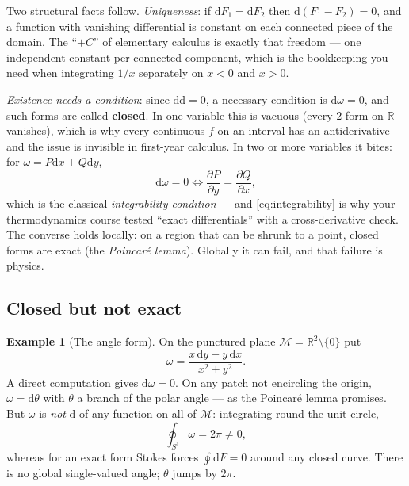 \documentclass[10pt,a4paper]{article}
\newcommand{\dd}{\mathrm{d}}
\newcommand{\R}{\mathbb{R}}
\newcommand{\M}{\mathcal{M}}
\newcommand{\pd}[2]{\frac{\partial #1}{\partial #2}}
\theoremstyle{plain}
\theoremstyle{definition}
\newtheorem{ex}[thm]{Example}
\numberwithin{equation}{section}
\begin{document}
\noindent Two structural facts follow. \emph{Uniqueness}: if $\dd F_1=\dd F_2$ then
$\dd(F_1-F_2)=0$, and a function with vanishing differential is constant on each connected
piece of the domain. The ``$+C$'' of elementary calculus is exactly that freedom --- one
independent constant per connected component, which is the bookkeeping you need when
integrating $1/x$ separately on $x<0$ and $x>0$.

\emph{Existence needs a condition}: since $\dd\dd=0$, a necessary condition is
$\dd\omega=0$, and such forms are called \textbf{closed}. In one variable this is vacuous
(every $2$-form on $\R$ vanishes), which is why every continuous $f$ on an interval has an
antiderivative and the issue is invisible in first-year calculus. In two or more variables it
bites: for $\omega=P\dd x+Q\dd y$,
\begin{equation}
\dd\omega=0\iff\pd{P}{y}=\pd{Q}{x},
\label{eq:integrability}
\end{equation}
which is the classical \emph{integrability condition} --- and \eqref{eq:integrability} is why
your thermodynamics course tested ``exact differentials'' with a cross-derivative check. The
converse holds locally: on a region that can be shrunk to a point, closed forms are exact
(the \emph{Poincar\'e lemma}). Globally it can fail, and that failure is physics.

\subsection{Closed but not exact}
\label{sec:closednotexact}

\begin{ex}[The angle form]\label{ex:dtheta}
On the punctured plane $\M=\R^2\setminus\{0\}$ put
\begin{equation}
\omega=\frac{x\,\dd y-y\,\dd x}{x^2+y^2}.
\end{equation}
A direct computation gives $\dd\omega=0$. On any patch not encircling the origin,
$\omega=\dd\theta$ with $\theta$ a branch of the polar angle --- as the Poincar\'e lemma
promises. But $\omega$ is \emph{not} $\dd$ of any function on all of $\M$: integrating round the
unit circle,
\begin{equation}
\oint_{S^1}\omega=2\pi\ne0 ,
\end{equation}
whereas for an exact form Stokes forces $\oint\dd F=0$ around any closed curve. There is no
global single-valued angle; $\theta$ jumps by $2\pi$.
\end{ex}
\end{document}
